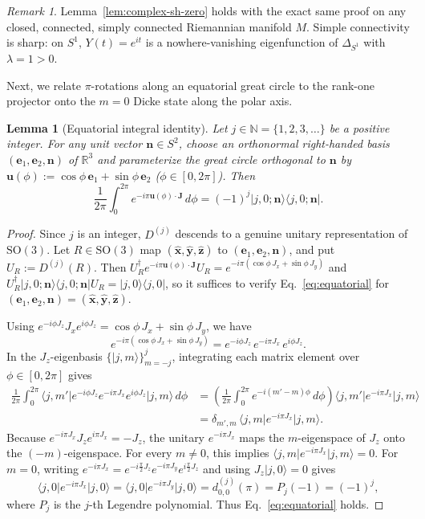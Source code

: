 \documentclass[11pt,a4paper]{article}
\newtheorem{lemma}[theorem]{Lemma}
\theoremstyle{remark}
\newtheorem{remark}[theorem]{Remark}
\newcommand{\ket}[1]{\lvert #1 \rangle}
\newcommand{\bra}[1]{\langle #1 \rvert}
\newcommand{\bn}{\mathbf{n}}
\newcommand{\bu}{\mathbf{u}}
\newcommand{\bJ}{\mathbf{J}}
\newcommand{\be}{\mathbf{e}}
\begin{document}
\begin{remark}
Lemma~\ref{lem:complex-sh-zero} holds with the exact same proof on any closed, connected, simply connected Riemannian manifold $M$. Simple connectivity is sharp: on $S^1$, $Y(t) = e^{it}$ is a nowhere-vanishing eigenfunction of $\Delta_{S^1}$ with $\lambda = 1 > 0$.
\end{remark}

Next, we relate $\pi$-rotations along an equatorial great circle to the rank-one projector onto the $m=0$ Dicke state along the polar axis.

\begin{lemma}[Equatorial integral identity]\label{lem:equatorial}
Let $j \in \mathbb{N} = \{1, 2, 3, \dots\}$ be a positive integer. For any unit vector $\bn \in S^2$, choose an orthonormal right-handed basis $(\be_1, \be_2, \bn)$ of $\mathbb{R}^3$ and parameterize the great circle orthogonal to $\bn$ by $\bu(\phi) := \cos\phi\,\be_1 + \sin\phi\,\be_2$ ($\phi \in [0, 2\pi]$). Then
\begin{equation}\label{eq:equatorial}
\frac{1}{2\pi}\int_{0}^{2\pi} e^{-i\pi \bu(\phi)\cdot\bJ}\,d\phi = (-1)^j \ket{j,0;\bn}\bra{j,0;\bn}.
\end{equation}
\end{lemma}

\begin{proof}
Since $j$ is an integer, $D^{(j)}$ descends to a genuine unitary representation of $\mathrm{SO}(3)$. Let $R \in \mathrm{SO}(3)$ map $(\hat{\mathbf{x}}, \hat{\mathbf{y}}, \hat{\mathbf{z}})$ to $(\be_1, \be_2, \bn)$, and put $U_R := D^{(j)}(R)$. Then $U_R^\dagger e^{-i\pi \bu(\phi)\cdot\bJ} U_R = e^{-i\pi(\cos\phi\,J_x + \sin\phi\,J_y)}$ and $U_R^\dagger \ket{j,0;\bn}\bra{j,0;\bn} U_R = \ket{j,0}\bra{j,0}$, so it suffices to verify Eq.~\eqref{eq:equatorial} for $(\be_1, \be_2, \bn) = (\hat{\mathbf{x}}, \hat{\mathbf{y}}, \hat{\mathbf{z}})$.

Using $e^{-i\phi J_z} J_x e^{i\phi J_z} = \cos\phi\,J_x + \sin\phi\,J_y$, we have
\[
e^{-i\pi(\cos\phi\,J_x + \sin\phi\,J_y)} = e^{-i\phi J_z}\, e^{-i\pi J_x}\, e^{i\phi J_z}.
\]
In the $J_z$-eigenbasis $\{\ket{j,m}\}_{m=-j}^{j}$, integrating each matrix element over $\phi \in [0,2\pi]$ gives
\begin{align*}
\frac{1}{2\pi}\int_{0}^{2\pi} \bra{j,m'} e^{-i\phi J_z} e^{-i\pi J_x} e^{i\phi J_z} \ket{j,m}\,d\phi
&= \left(\frac{1}{2\pi}\int_{0}^{2\pi} e^{-i(m'-m)\phi}\,d\phi\right) \bra{j,m'} e^{-i\pi J_x} \ket{j,m} \\
&= \delta_{m',m}\,\bra{j,m} e^{-i\pi J_x} \ket{j,m}.
\end{align*}
Because $e^{-i\pi J_x} J_z e^{i\pi J_x} = -J_z$, the unitary $e^{-i\pi J_x}$ maps the $m$-eigenspace of $J_z$ onto the $(-m)$-eigenspace. For every $m \neq 0$, this implies $\bra{j,m} e^{-i\pi J_x} \ket{j,m} = 0$. For $m = 0$, writing $e^{-i\pi J_x} = e^{-i\frac{\pi}{2}J_z} e^{-i\pi J_y} e^{i\frac{\pi}{2}J_z}$ and using $J_z\ket{j,0} = 0$ gives
\[
\bra{j,0} e^{-i\pi J_x} \ket{j,0} = \bra{j,0} e^{-i\pi J_y} \ket{j,0} = d^{(j)}_{0,0}(\pi) = P_j(-1) = (-1)^j,
\]
where $P_j$ is the $j$-th Legendre polynomial. Thus Eq.~\eqref{eq:equatorial} holds.
\end{proof}
\end{document}
